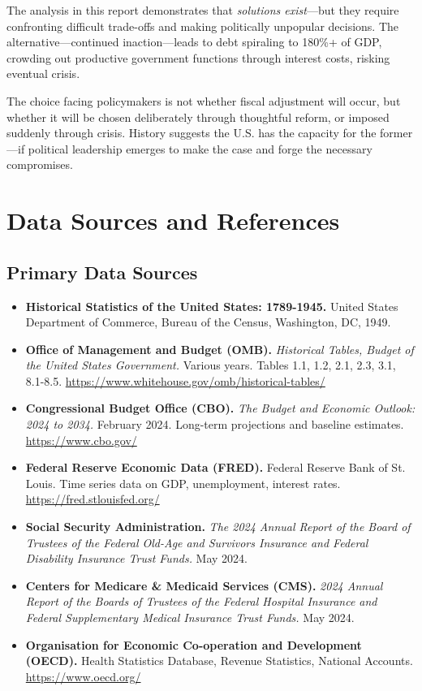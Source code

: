 \documentclass[12pt,letterpaper]{article}
\begin{document}
The analysis in this report demonstrates that \textit{solutions exist}—but they require confronting difficult trade-offs and making politically unpopular decisions. The alternative—continued inaction—leads to debt spiraling to 180\%+ of GDP, crowding out productive government functions through interest costs, risking eventual crisis.

The choice facing policymakers is not whether fiscal adjustment will occur, but whether it will be chosen deliberately through thoughtful reform, or imposed suddenly through crisis. History suggests the U.S. has the capacity for the former—if political leadership emerges to make the case and forge the necessary compromises.

\newpage

\section{Data Sources and References}

\subsection{Primary Data Sources}

\begin{itemize}
    \item \textbf{Historical Statistics of the United States: 1789-1945.} United States Department of Commerce, Bureau of the Census, Washington, DC, 1949.

    \item \textbf{Office of Management and Budget (OMB).} \textit{Historical Tables, Budget of the United States Government.} Various years. Tables 1.1, 1.2, 2.1, 2.3, 3.1, 8.1-8.5. \url{https://www.whitehouse.gov/omb/historical-tables/}

    \item \textbf{Congressional Budget Office (CBO).} \textit{The Budget and Economic Outlook: 2024 to 2034.} February 2024. Long-term projections and baseline estimates. \url{https://www.cbo.gov/}

    \item \textbf{Federal Reserve Economic Data (FRED).} Federal Reserve Bank of St. Louis. Time series data on GDP, unemployment, interest rates. \url{https://fred.stlouisfed.org/}

    \item \textbf{Social Security Administration.} \textit{The 2024 Annual Report of the Board of Trustees of the Federal Old-Age and Survivors Insurance and Federal Disability Insurance Trust Funds.} May 2024.

    \item \textbf{Centers for Medicare \& Medicaid Services (CMS).} \textit{2024 Annual Report of the Boards of Trustees of the Federal Hospital Insurance and Federal Supplementary Medical Insurance Trust Funds.} May 2024.

    \item \textbf{Organisation for Economic Co-operation and Development (OECD).} Health Statistics Database, Revenue Statistics, National Accounts. \url{https://www.oecd.org/}
\end{itemize}
\end{document}

